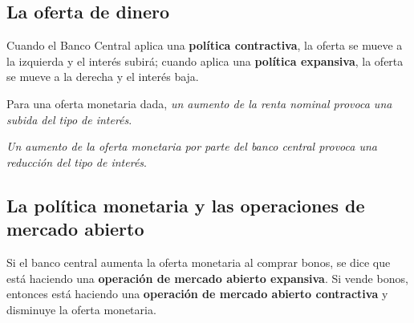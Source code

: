\documentclass[10pt, landscape]{article}
\begin{document}
\begin{multicols*}{3}
\subsection{La oferta de dinero}

Cuando el Banco Central aplica una \textbf{política contractiva}, la oferta se mueve a la izquierda y el interés subirá; cuando aplica una \textbf{política expansiva}, la oferta se mueve a la derecha y el interés baja.

\begin{center}    
\end{center}

Para una oferta monetaria dada, \textit{un aumento de la renta nominal provoca una subida del tipo de interés}. 

\textit{Un aumento de la oferta monetaria por parte del banco central provoca una reducción del tipo de interés}.

\subsection{La política monetaria y las operaciones de mercado abierto}
Si el banco central aumenta la oferta monetaria al comprar bonos, se dice que está haciendo una \textbf{operación de mercado abierto expansiva}. Si vende bonos, entonces está haciendo una \textbf{operación de mercado abierto contractiva} y disminuye la oferta monetaria.


\end{multicols*}
\end{document}
